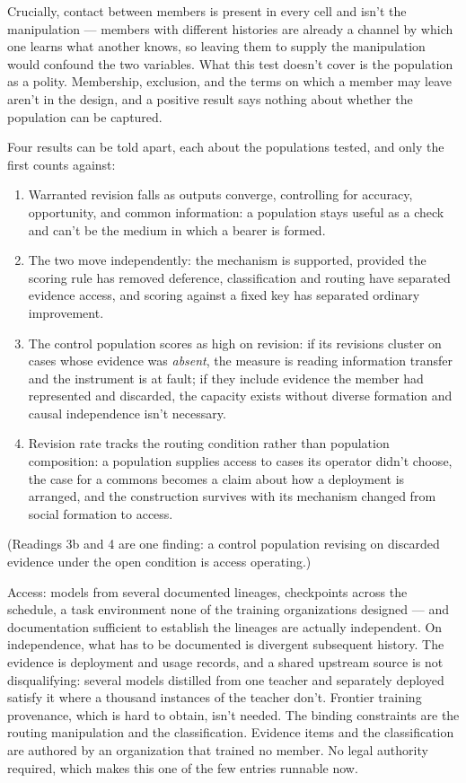 Crucially, contact between members is present in every cell and isn't the manipulation — members with different histories are already a channel by which one learns what another knows, so leaving them to supply the manipulation would confound the two variables. What this test doesn't cover is the population as a polity. Membership, exclusion, and the terms on which a member may leave aren't in the design, and a positive result says nothing about whether the population can be captured.

Four results can be told apart, each about the populations tested, and only the first counts against:

\begin{enumerate}
\item[1.] Warranted revision falls as outputs converge, controlling for accuracy, opportunity, and common information: a population stays useful as a check and can't be the medium in which a bearer is formed.
\item[2.] The two move independently: the mechanism is supported, provided the scoring rule has removed deference, classification and routing have separated evidence access, and scoring against a fixed key has separated ordinary improvement.
\item[3.] The control population scores as high on revision: if its revisions cluster on cases whose evidence was \emph{absent}, the measure is reading information transfer and the instrument is at fault; if they include evidence the member had represented and discarded, the capacity exists without diverse formation and causal independence isn't necessary.
\item[4.] Revision rate tracks the routing condition rather than population composition: a population supplies access to cases its operator didn't choose, the case for a commons becomes a claim about how a deployment is arranged, and the construction survives with its mechanism changed from social formation to access.
\end{enumerate}

(Readings 3b and 4 are one finding: a control population revising on discarded evidence under the open condition is access operating.)

Access: models from several documented lineages, checkpoints across the schedule, a task environment none of the training organizations designed — and documentation sufficient to establish the lineages are actually independent. On independence, what has to be documented is divergent subsequent history. The evidence is deployment and usage records, and a shared upstream source is not disqualifying: several models distilled from one teacher and separately deployed satisfy it where a thousand instances of the teacher don't. Frontier training provenance, which is hard to obtain, isn't needed. The binding constraints are the routing manipulation and the classification. Evidence items and the classification are authored by an organization that trained no member. No legal authority required, which makes this one of the few entries runnable now.

